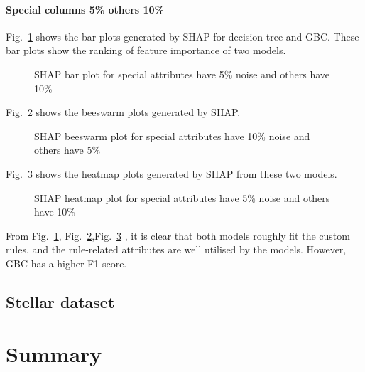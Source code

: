 \documentclass[runningheads,a4paper]{llncs}
\begin{document}
\paragraph{Special columns 5\% others 10\%}
Fig.~\ref{bar plots special_lower 10} shows the bar plots generated by SHAP for decision tree and GBC. These bar plots show the ranking of feature importance of two models.
\begin{figure}[H]
	\centering
	
	\hfill
	
	
	\caption{SHAP bar plot for special attributes have 5\% noise and others have 10\% }
	\label{bar plots special_lower 10}
\end{figure}
Fig.~\ref{bee plots special_lower 10} shows the beeswarm plots generated by SHAP.
\begin{figure}[H]
	\centering
	
	\hfill
	
	
	\caption{SHAP beeswarm plot for special attributes have 10\% noise and others have 5\% }
	\label{bee plots special_lower 10}
	
\end{figure}
Fig.~\ref{heat plots special_lower 10} shows the heatmap plots generated by SHAP from these two models.
\begin{figure}[H]
	\centering
	
	\hfill
	
	
	\caption{SHAP heatmap plot for special attributes have 5\% noise and others have 10\%}
	\label{heat plots special_lower 10}
	
\end{figure}

From Fig.~\ref{bar plots special_lower 10}, Fig.~\ref{bee plots special_lower 10},Fig.~\ref{heat plots special_lower 10} , it is clear that both models roughly fit the custom rules, and the rule-related attributes are well utilised by the models. However, GBC has a higher F1-score.

\subsection{Stellar dataset}
\section{Summary}





\newpage



\end{document}
